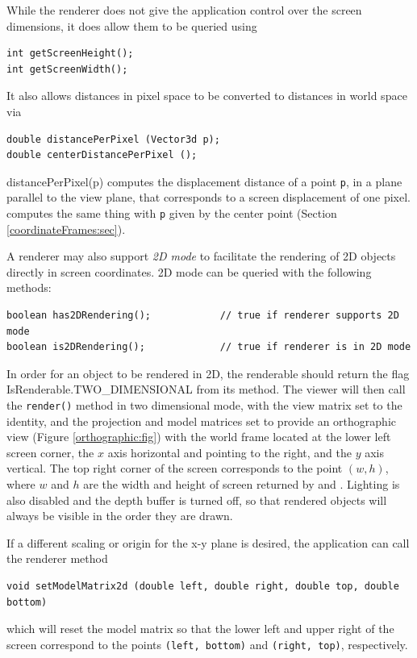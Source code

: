 While the renderer does not give the application control over the
screen dimensions, it does allow them to be queried using
%
\begin{lstlisting}[]
int getScreenHeight();
int getScreenWidth();
\end{lstlisting}
%
It also allows distances in pixel space to be converted to
distances in world space via
%
\begin{lstlisting}[]
double distancePerPixel (Vector3d p);
double centerDistancePerPixel ();
\end{lstlisting}
%
%
{distancePerPixel(p)} computes the displacement distance of a point
{\tt p}, in a plane parallel to the view plane, that corresponds to a
screen displacement of one pixel.
computes the same thing with {\tt p} given by the center point
(Section \ref{coordinateFrames:sec}).

A renderer may also support {\it 2D mode} to facilitate the rendering
of 2D objects directly in screen coordinates. 2D mode
can be queried with the following methods:
%
\begin{lstlisting}[]
boolean has2DRendering();            // true if renderer supports 2D mode
boolean is2DRendering();             // true if renderer is in 2D mode
\end{lstlisting}
%
In order for an object to be rendered in 2D, the renderable should
return the flag
%
{IsRenderable.TWO\_DIMENSIONAL} from its
 method.
The viewer will then call the {\tt render()} method in two dimensional
mode, with the view matrix set to the identity, and the projection and
model matrices set to provide an orthographic view (Figure
\ref{orthographic:fig}) with the world frame located at the lower left
screen corner, the $x$ axis horizontal and pointing to the right, and
the $y$ axis vertical. The top right corner of the screen corresponds
to the point $(w, h)$, where $w$ and $h$ are the width and height of
screen returned by 
 and
.
Lighting is also disabled and the depth buffer
is turned off, so that rendered objects will always be visible in the
order they are drawn. 

If a different scaling or origin for the x-y plane is desired,
the application can call the renderer method
%
\begin{lstlisting}[]
void setModelMatrix2d (double left, double right, double top, double bottom)
\end{lstlisting}
%
which will reset the model matrix so that the lower left and upper right
of the screen correspond to the points
{\tt (left, bottom)} and {\tt (right, top)}, respectively.


